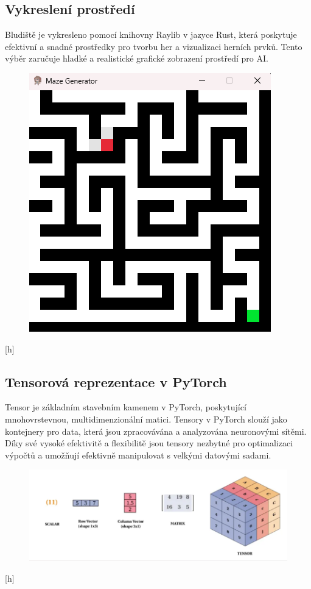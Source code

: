 \documentclass[12pt, a4paper,
twoside,        %
openright
]{report}
\begin{document}
\subsection{Vykreslení prostředí}
Bludiště je vykresleno pomocí knihovny Raylib v jazyce Rust, která poskytuje efektivní a snadné prostředky pro tvorbu her a vizualizaci herních prvků. Tento výběr zaručuje hladké a realistické grafické zobrazení prostředí pro AI.
\begin{figure}[h]
	\centering
	\includegraphics[width=0.3\linewidth, height=0.3\linewidth, keepaspectratio]{image/map.png}
\end{figure}[h]
\subsection{Tensorová reprezentace v PyTorch}
Tensor je základním stavebním kamenem v PyTorch, poskytující mnohovrstevnou, multidimenzionální matici. Tensory v PyTorch slouží jako kontejnery pro data, která jsou zpracovávána a analyzována neuronovými sítěmi. Díky své vysoké efektivitě a flexibilitě jsou tensory nezbytné pro optimalizaci výpočtů a umožňují efektivně manipulovat s velkými datovými sadami.

\begin{figure}[h]
	\centering
	\includegraphics[width=0.8\linewidth, height=0.8\linewidth, keepaspectratio]{image/nazev.png}
\end{figure}[h]
\end{document}
